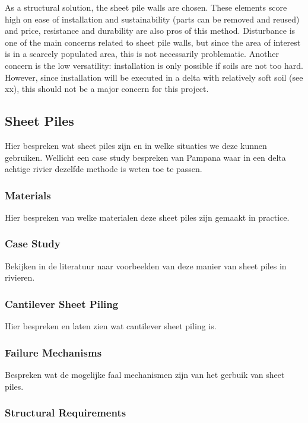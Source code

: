As a structural solution, the sheet pile walls are chosen. These elements score high on ease of installation and sustainability (parts can be removed and reused) and price, resistance and durability are also pros of this method. Disturbance is one of the main concerns related to sheet pile walls, but since the area of interest is in a scarcely populated area, this is not necessarily problematic. Another concern is the low versatility: installation is only possible if soils are not too hard. However, since installation will be executed in a delta with relatively soft soil (see xx), this should not be a major concern for this project.

\subsection{Sheet Piles}

Hier bespreken wat sheet piles zijn en in welke situaties we deze kunnen gebruiken. Wellicht een case study bespreken van Pampana waar in een delta achtige rivier dezelfde methode is weten toe te passen.

\subsubsection{Materials}

Hier bespreken van welke materialen deze sheet piles zijn gemaakt in practice.

\subsubsection{Case Study}

Bekijken in de literatuur naar voorbeelden van deze manier van sheet piles in rivieren.

\subsubsection{Cantilever Sheet Piling}

Hier bespreken en laten zien wat cantilever sheet piling is. 

\subsubsection{Failure Mechanisms}

Bespreken wat de mogelijke faal mechanismen zijn van het gerbuik van sheet piles.

\subsubsection{Structural Requirements}

